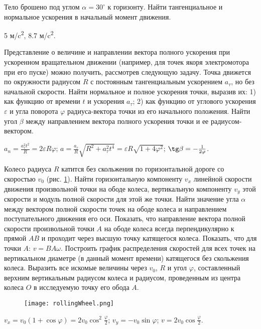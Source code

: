 \begin{ex} %
Тело брошено под углом $\alpha = 30^{\circ}$ к горизонту. Найти тангенциальное и нормальное ускорения в начальный момент движения.
\begin{ans}
5 м/c\textsuperscript{2}, 8.7 м/c\textsuperscript{2}.
\end{ans}
\end{ex}

\begin{ex} %
Представление о величине и направлении вектора полного ускорения при ускоренном вращательном движении (например, для точек якоря электромотора при его пуске) можно получить, рассмотрев следующую задачу. Точка движется по окружности радиусом $R$ с постоянным тангенциальным ускорением $a_{\tau}$, но без начальной скорости. Найти нормальное и полное ускорения точки, выразив их: 1) как функцию от времени $t$ и ускорения $a_{\tau}$; 2) как функцию от углового ускорения $\varepsilon$ и угла поворота $\varphi$ радиуса-вектора точки из его начального положения. Найти угол $\beta$ между направлением вектора полного ускорения точки и ее
радиусом-вектором.
\begin{ans}
$a_n = \frac{a_{\tau}^2 t^2}{R} = 2 \varepsilon R \varphi$; $a = \frac{a_{\tau}}{R} \sqrt{R^2 + a_{\tau}^2 t^4} = \varepsilon R \sqrt{1 + 4 \varphi^2}$; $\tg \beta = -\frac{1}{2\varphi}$.
\end{ans}
\end{ex}

\complexProblems

\begin{ex} %
Колесо радиуса $R$ катится без скольжения по горизонтальной дороге со скоростью $v_0$ (рис. \ref{rollingWheel}). Найти горизонтальную компоненту $v_x$ линейной скорости движения произвольной точки на ободе колеса, вертикальную компоненту $v_y$ этой скорости и модуль полной скорости для этой же точки. Найти значение угла $\alpha$ между вектором полной скорости точек на ободе колеса и направлением поступательного движения его оси. Показать, что направление вектора полной скорости произвольной точки $A$ на ободе колеса всегда перпендикулярно к прямой $AB$ и проходит через высшую точку катящегося колеса. Показать, что для точки $A$: $v = BA \omega$. Построить график распределения скоростей для всех точек на вертикальном диаметре (в данный момент времени) катящегося без скольжения колеса. Выразить все искомые величины через $v_0$, $R$ и угол $\varphi$, составленный верхним вертикальным радиусом колеса и радиусом, проведенным из центра колеса $O$ в исследуемую точку его обода $A$.

\begin{figure}[h]
\centering
\texttt{[image: rollingWheel.png]}
\caption{}
\label{rollingWheel}
\end{figure}

\begin{ans}
$v_x = v_0 (1 + \cos \varphi) = 2v_0 \cos^2 \frac{\varphi}{2}$; $v_y = -v_0 \sin \varphi$; $v = 2v_0 \cos \frac{\varphi}{2}$.
\end{ans}
\end{ex}


